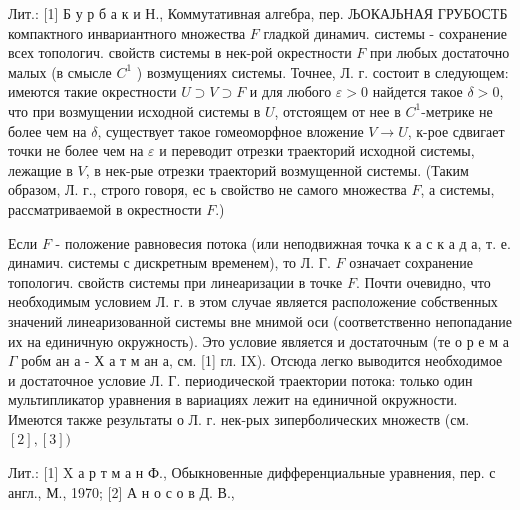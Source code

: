 \documentclass[10pt]{article}
\begin{document}
Лит.: [1] Б у р б а к и Н., Коммутативная алгебра, пер. ЉОКАЈЬНАЯ ГРУБОСТБ компактного инвариантного множества $F$ гладкой динамич. системы - сохранение всех топологич. свойств системы в нек-рой окрестности $F$ при любых достаточно малых (в смысле $C^{1}$ ) возмущениях системы. Точнее, Л. г. состоит в следующем: имеются такие окрестности $U \supset V \supset F$ и для любого $\varepsilon>0$ найдется такое $\delta>0$, что при возмущении исходной системы в $U$, отстоящем от нее в $C^{1}$-метрике не более чем на $\delta$, существует такое гомеоморфное вложение $V \rightarrow U$, к-рое сдвигает точки не более чем на $\varepsilon$ и переводит отрезки траекторий исходной системы, лежащие в $V$, в нек-рые отрезки траекторий возмущенной системы. (Таким образом, Л. г., строго говоря, ес ь свойство не самого множества $F$, а системы, рассматриваемой в окрестности $F$.)



Если $F$ - положение равновесия потока (или неподвижная точка к а с к а д а, т. е. динамич. системы с дискретным временем), то Л. Г. $F$ означает сохранение топологич. свойств системы при линеаризации в точке $F$. Почти очевидно, что необходимым условием Л. г. в этом случае является расположение собственных значений линеаризованной системы вне мнимой оси (соответственно непопадание их на единичную окружность). Это условие является и достаточным (те о р е м а $\Gamma$ робм ан а - Х а т м ан а, см. [1] гл. IX). Отсюда легко выводится необходимое и достаточное условие Л. Г. периодической траектории потока: только один мультипликатор уравнения в вариациях лежит на единичной окружности. Имеются также результаты о Л. г. нек-рых зиперболических множеств (см. $[2],[3])$



Лит.: [1] X а р т м а н Ф., Обыкновенные дифференциальные уравнения, пер. с англ., М., 1970; [2] А н о с о в Д. В.,
\end{document}
